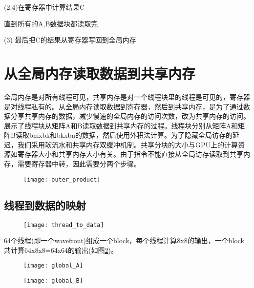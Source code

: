    (2.4)在寄存器中计算结果C

直到所有的A,B数据块都读取完

(3)  最后把C的结果从寄存器写回到全局内存


\section{从全局内存读取数据到共享内存}
全局内存是对所有线程可见，共享内存是对一个线程块里的线程是可见的，寄存器是对线程私有的。从全局内存读取数据到寄存器，然后到共享内存，是为了通过数据分享共享内存的数据，减少慢速的全局内存的访问次数，改为共享内存的访问。展示了线程块从矩阵A和B读取数据到共享内存的过程。线程块分别从矩阵A和矩阵B读取bmxbk和bkxbn的数据，然后使用外积法计算。为了隐藏全局访存的延迟，我们采用软流水和共享内存双缓冲机制。共享分块的大小与GPU上的计算资源如寄存器大小和共享内存大小有关。由于指令不能直接从全局访存读取到共享内存，需要寄存器中转，因此需要分两个步骤。

\begin{figure}[htbp]
	\centering
	\texttt{[image: outer\_product]}
	\label{fig:outer_product}
\end{figure}

\subsection{线程到数据的映射}

\begin{figure}[htbp]
	\centering
	\texttt{[image: thread\_to\_data]}
	\label{fig:thread_to_data}
\end{figure}

64个线程(即一个wavefront)组成一个block，每个线程计算8x8的输出，一个block共计算64x8x8=64x64的输出(如图\ref{fig:thread_to_data})。

\begin{figure}[htbp]
	\centering
	\texttt{[image: global\_A]}
	\label{fig:global_A}
\end{figure}

\begin{figure}[htbp]
	\centering
	\texttt{[image: global\_B]}
	\label{fig:global_B}
\end{figure}

